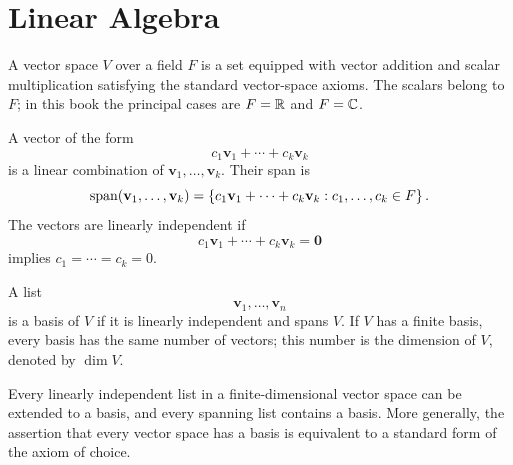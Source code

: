     \chapter{Linear Algebra}



    \begin{definition}
        A vector space $V$ over a field $F$ is a set equipped with vector
        addition and scalar multiplication satisfying the standard vector-space
        axioms. The scalars belong to $F$; in this book the principal cases are
        $F=\mathbb{R}$ and $F=\mathbb{C}$.
    \end{definition}

    \begin{definition}
        A vector of the form
        \[
            c_1\mathbf{v}_1+\cdots+c_k\mathbf{v}_k
        \]
        is a linear combination of $\mathbf{v}_1,\dots,\mathbf{v}_k$. Their
        span is
        \[
            \operatorname{span}(\mathbf{v}_1,\dots,\mathbf{v}_k)
            =
            \left\{
                c_1\mathbf{v}_1+\cdots+c_k\mathbf{v}_k
                :c_1,\dots,c_k\in F
            \right\}.
        \]
        The vectors are linearly independent if
        \[
            c_1\mathbf{v}_1+\cdots+c_k\mathbf{v}_k=\mathbf{0}
        \]
        implies $c_1=\cdots=c_k=0$.
    \end{definition}

    \begin{definition}
        A list
        \[
            \mathbf{v}_1,\dots,\mathbf{v}_n
        \]
        is a basis of $V$ if it is linearly independent and spans $V$. If $V$
        has a finite basis, every basis has the same number of vectors; this
        number is the dimension of $V$, denoted by $\dim V$.
    \end{definition}

    \begin{theorem}
        Every linearly independent list in a finite-dimensional vector space
        can be extended to a basis, and every spanning list contains a basis.
        More generally, the assertion that every vector space has a basis is
        equivalent to a standard form of the axiom of choice.
    \end{theorem}

